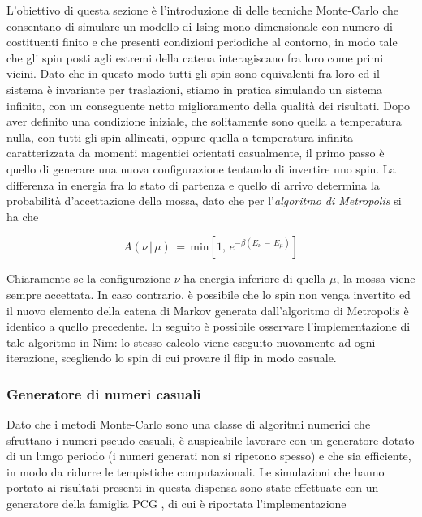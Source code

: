 L'obiettivo di questa sezione è l'introduzione di delle tecniche Monte-Carlo che consentano di simulare un modello di Ising mono-dimensionale con 
numero di costituenti finito e che presenti condizioni periodiche al contorno, in modo tale che gli spin posti agli estremi della catena 
interagiscano fra loro come primi vicini. Dato che in questo modo tutti gli spin sono equivalenti fra loro ed il sistema è invariante per 
traslazioni, stiamo in pratica simulando un sistema infinito, con un conseguente netto miglioramento della qualità dei risultati. 
Dopo aver definito una condizione iniziale, che solitamente sono quella a temperatura nulla, con tutti gli spin allineati, oppure 
quella a temperatura infinita caratterizzata da momenti magentici orientati casualmente, il primo passo è quello di generare una 
nuova configurazione tentando di invertire uno spin. La differenza in energia fra lo stato di partenza e quello di arrivo determina 
la probabilità d'accettazione della mossa, dato che per l'\textit{algoritmo di Metropolis} \cite{M(RT)2} si ha che 

\begin{equation}
    A\left(\nu\,|\,\mu\right)\,=\,\text{min}\left[1,\,e^{-\beta\left(E_{\nu}\,-\,E_{\mu}\right)}\right]
    \label{eq: Metropolis_1D}
\end{equation}

Chiaramente se la configurazione $\nu$ ha energia inferiore di quella $\mu$, la mossa viene sempre accettata. In caso contrario, è 
possibile che lo spin non venga invertito ed il nuovo elemento della catena di Markov generata dall'algoritmo di Metropolis è identico 
a quello precedente. In seguito è possibile osservare l'implementazione di tale algoritmo in Nim: lo stesso calcolo viene eseguito 
nuovamente ad ogni iterazione, scegliendo lo spin di cui provare il flip in modo casuale.



\subsubsection{Generatore di numeri casuali}

Dato che i metodi Monte-Carlo sono una classe di algoritmi numerici che sfruttano i numeri pseudo-casuali, è auspicabile lavorare 
con un generatore dotato di un lungo periodo (i numeri generati non si ripetono spesso) e che sia efficiente, in modo da ridurre le 
tempistiche computazionali. Le simulazioni che hanno portato ai risultati presenti in questa dispensa sono state effettuate con un 
generatore della famiglia PCG \cite{pcg2014}, di cui è riportata l'implementazione



